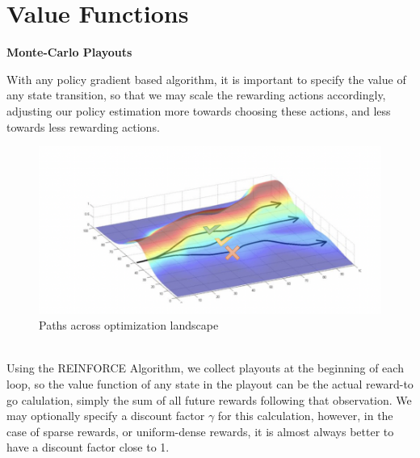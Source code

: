 \documentclass[11pt]{report}
\begin{document}
\section*{Value Functions}
\noindent\textbf{Monte-Carlo Playouts}
\par With any policy gradient based algorithm, it is important to specify the value of any state transition, so that we may scale the rewarding actions accordingly, adjusting our policy estimation more towards choosing these actions, and less towards less rewarding actions. 
\begin{figure}[h!]
	\center\includegraphics[scale=0.4]{loss_landscape.png}
	\caption{Paths across optimization landscape}
\end{figure}\\
Using the REINFORCE Algorithm, we collect playouts at the beginning of each loop, so the value function of any state in the playout can be the actual reward-to go calulation, simply the sum of all future rewards following that observation. We may optionally specify a discount factor $\gamma$ for this calculation, however, in the case of sparse rewards, or uniform-dense rewards, it is almost always better to have a discount factor close to 1. 

\newpage
\nocite{*}
{}

	
\end{document}
